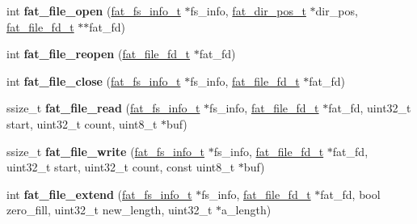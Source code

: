 \begin{DoxyCompactItemize}
\item 
\mbox{\label{group__libfs__ff_gaa84d7c17cb4472bfc5f3508c4297584b}} 
int {\bfseries fat\+\_\+file\+\_\+open} (\mbox{\hyperlink{structfat__fs__info__s}{fat\+\_\+fs\+\_\+info\+\_\+t}} $\ast$fs\+\_\+info, \mbox{\hyperlink{structfat__dir__pos__s}{fat\+\_\+dir\+\_\+pos\+\_\+t}} $\ast$dir\+\_\+pos, \mbox{\hyperlink{group__libfs__ff_gaa53f9c544914509505e3cfbd3796f877}{fat\+\_\+file\+\_\+fd\+\_\+t}} $\ast$$\ast$fat\+\_\+fd)
\item 
\mbox{\label{group__libfs__ff_ga670f99a4b6502ac7f2b069074ba57dcb}} 
int {\bfseries fat\+\_\+file\+\_\+reopen} (\mbox{\hyperlink{group__libfs__ff_gaa53f9c544914509505e3cfbd3796f877}{fat\+\_\+file\+\_\+fd\+\_\+t}} $\ast$fat\+\_\+fd)
\item 
\mbox{\label{group__libfs__ff_ga9593edd203b7d420e4816672b72b8c89}} 
int {\bfseries fat\+\_\+file\+\_\+close} (\mbox{\hyperlink{structfat__fs__info__s}{fat\+\_\+fs\+\_\+info\+\_\+t}} $\ast$fs\+\_\+info, \mbox{\hyperlink{group__libfs__ff_gaa53f9c544914509505e3cfbd3796f877}{fat\+\_\+file\+\_\+fd\+\_\+t}} $\ast$fat\+\_\+fd)
\item 
\mbox{\label{group__libfs__ff_ga594f426ebc7d6e788f271701485ad825}} 
ssize\+\_\+t {\bfseries fat\+\_\+file\+\_\+read} (\mbox{\hyperlink{structfat__fs__info__s}{fat\+\_\+fs\+\_\+info\+\_\+t}} $\ast$fs\+\_\+info, \mbox{\hyperlink{group__libfs__ff_gaa53f9c544914509505e3cfbd3796f877}{fat\+\_\+file\+\_\+fd\+\_\+t}} $\ast$fat\+\_\+fd, uint32\+\_\+t start, uint32\+\_\+t count, uint8\+\_\+t $\ast$buf)
\item 
\mbox{\label{group__libfs__ff_ga2cb92684053d7fc5036bc5f03e72d066}} 
ssize\+\_\+t {\bfseries fat\+\_\+file\+\_\+write} (\mbox{\hyperlink{structfat__fs__info__s}{fat\+\_\+fs\+\_\+info\+\_\+t}} $\ast$fs\+\_\+info, \mbox{\hyperlink{group__libfs__ff_gaa53f9c544914509505e3cfbd3796f877}{fat\+\_\+file\+\_\+fd\+\_\+t}} $\ast$fat\+\_\+fd, uint32\+\_\+t start, uint32\+\_\+t count, const uint8\+\_\+t $\ast$buf)
\item 
\mbox{\label{group__libfs__ff_ga12e8cfa7766516d1add39d8e6584cf95}} 
int {\bfseries fat\+\_\+file\+\_\+extend} (\mbox{\hyperlink{structfat__fs__info__s}{fat\+\_\+fs\+\_\+info\+\_\+t}} $\ast$fs\+\_\+info, \mbox{\hyperlink{group__libfs__ff_gaa53f9c544914509505e3cfbd3796f877}{fat\+\_\+file\+\_\+fd\+\_\+t}} $\ast$fat\+\_\+fd, bool zero\+\_\+fill, uint32\+\_\+t new\+\_\+length, uint32\+\_\+t $\ast$a\+\_\+length)
$$
\end{DoxyCompactItemize}

